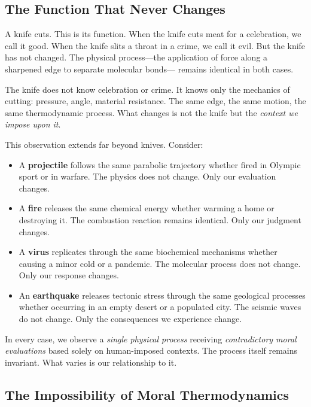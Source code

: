 \documentclass[11pt,a4paper]{article}
\begin{document}
\subsection{The Function That Never Changes}

A knife cuts. This is its function. When the knife cuts meat for a 
celebration, we call it good. When the knife slits a throat in a crime, we 
call it evil. But the knife has not changed. The physical process—the 
application of force along a sharpened edge to separate molecular bonds—
remains identical in both cases.

The knife does not know celebration or crime. It knows only the mechanics of 
cutting: pressure, angle, material resistance. The same edge, the same motion, 
the same thermodynamic process. What changes is not the knife but the 
\emph{context we impose upon it}.

This observation extends far beyond knives. Consider:

\begin{itemize}[leftmargin=2em]
\item A \textbf{projectile} follows the same parabolic trajectory whether 
fired in Olympic sport or in warfare. The physics does not change. Only our 
evaluation changes.

\item A \textbf{fire} releases the same chemical energy whether warming a 
home or destroying it. The combustion reaction remains identical. Only our 
judgment changes.

\item A \textbf{virus} replicates through the same biochemical mechanisms 
whether causing a minor cold or a pandemic. The molecular process does not 
change. Only our response changes.

\item An \textbf{earthquake} releases tectonic stress through the same 
geological processes whether occurring in an empty desert or a populated city. 
The seismic waves do not change. Only the consequences we experience change.
\end{itemize}

In every case, we observe a \emph{single physical process} receiving 
\emph{contradictory moral evaluations} based solely on human-imposed contexts. 
The process itself remains invariant. What varies is our relationship to it.

\subsection{The Impossibility of Moral Thermodynamics}
\end{document}
